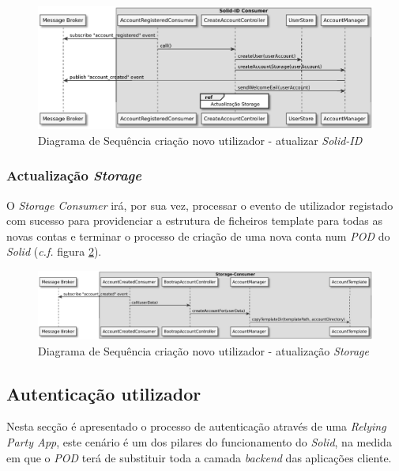 \begin{figure}[H]
    \begin{center}
    \includegraphics[width=1 \textwidth]{figures/create_account_sd_diagram_2.eps}
    \caption{Diagrama de Sequência criação novo utilizador - atualizar \emph{Solid-ID}}
    \label{registo_conta_sd2}
    \end{center}
\end{figure}

\subsubsection{Actualização \emph{Storage}}

O \emph{Storage Consumer} irá, por sua vez, processar o evento de utilizador registado com sucesso para providenciar a estrutura de ficheiros template para todas as novas contas e terminar o processo de criação de uma nova conta num \emph{\acrshort{POD}} do \emph{Solid} (\emph{c.f.} figura \ref{registo_conta_sd3}).

\begin{figure}[H]
    \begin{center}
    \includegraphics[width=1 \textwidth]{figures/create_account_sd_diagram_3.eps}
    \caption{Diagrama de Sequência criação novo utilizador - atualização \emph{Storage}}
        \label{registo_conta_sd3}
    \end{center}
\end{figure}

\subsection{Autenticação utilizador \label{design_authentication}}
Nesta secção é apresentado o processo de autenticação através de uma \emph{Relying Party App}, este cenário é um dos pilares do funcionamento do \emph{Solid}, na medida em que o \emph{\acrshort{POD}} terá de substituir toda a camada \emph{backend} das aplicações cliente.

